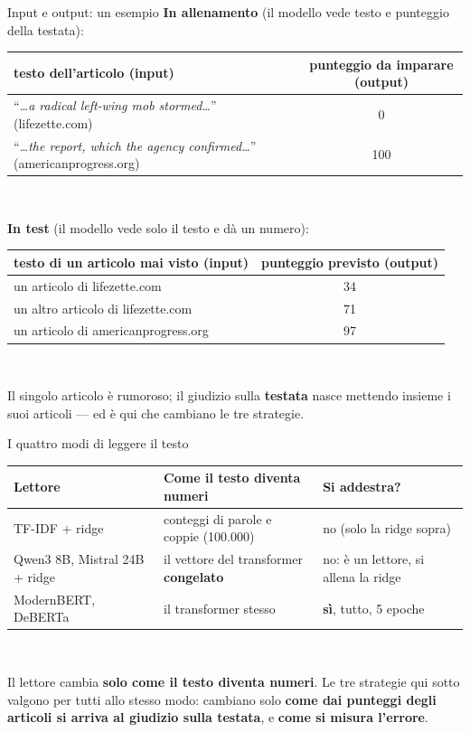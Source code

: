 \documentclass[aspectratio=169]{beamer}
\newcommand{\hl}[1]{\textbf{#1}}
\begin{document}
\begin{frame}{Input e output: un esempio}
  \vfill
  \small
  \hl{In allenamento} (il modello vede testo e punteggio della testata):\\[0.4em]
  \centering
  \begin{tabular}{>{\raggedright\arraybackslash}p{}c}
    \toprule
    \textbf{testo dell'articolo (input)} & \textbf{punteggio da imparare (output)} \\
    \midrule
    ``\textit{\ldots a radical left-wing mob stormed\ldots}'' (lifezette.com) & 0 \\
    ``\textit{\ldots the report, which the agency confirmed\ldots}'' (americanprogress.org) & 100 \\
    \bottomrule
  \end{tabular}\\[1em]
  \raggedright
  \hl{In test} (il modello vede solo il testo e d\`a un numero):\\[0.4em]
  \centering
  \begin{tabular}{>{\raggedright\arraybackslash}p{}c}
    \toprule
    \textbf{testo di un articolo mai visto (input)} & \textbf{punteggio previsto (output)} \\
    \midrule
    un articolo di lifezette.com & 34 \\
    un altro articolo di lifezette.com & 71 \\
    un articolo di americanprogress.org & 97 \\
    \bottomrule
  \end{tabular}\\[0.8em]
  \raggedright
  Il singolo articolo \`e rumoroso; il giudizio sulla \hl{testata} nasce mettendo insieme i suoi articoli --- ed \`e qui
  che cambiano le tre strategie.
\end{frame}

\begin{frame}{I quattro modi di leggere il testo}
  \vfill
  \centering\small
  \begin{tabular}{>{\raggedright\arraybackslash}p{}>{\raggedright\arraybackslash}p{}>{\raggedright\arraybackslash}p{}}
    \toprule
    \textbf{Lettore} & \textbf{Come il testo diventa numeri} & \textbf{Si addestra?} \\
    \midrule
    TF-IDF + ridge & conteggi di parole e coppie (100.000) & no (solo la ridge sopra) \\
    \addlinespace
    Qwen3 8B, Mistral 24B + ridge & il vettore del transformer \hl{congelato} & no: \`e un lettore, si allena la ridge \\
    \addlinespace
    ModernBERT, DeBERTa & il transformer stesso & \hl{s\`i}, tutto, 5 epoche \\
    \bottomrule
  \end{tabular}\\[1em]
  \raggedright
  Il lettore cambia \hl{solo come il testo diventa numeri}. Le tre strategie qui sotto valgono per tutti allo stesso modo:
  cambiano solo \hl{come dai punteggi degli articoli si arriva al giudizio sulla testata}, e \hl{come si misura l'errore}.
  \vfill
\end{frame}
\end{document}
